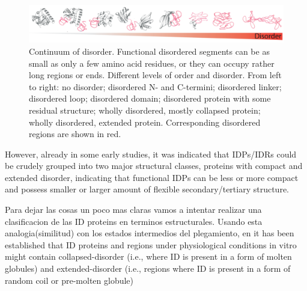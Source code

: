 \begin{figure}[htbp]
\centering
\includegraphics[width=1.0\textwidth]{img/conformationContinuum.png} 
\caption{Continuum of disorder. Functional disordered segments can be as small as only a few amino acid residues, or they can occupy rather long
regions or ends. Different levels of order and disorder. From left to right: no disorder; disordered N- and C-termini; disordered linker; disordered loop;
disordered domain; disordered protein with some residual structure; wholly disordered, mostly collapsed protein; wholly disordered, extended protein.
Corresponding disordered regions are shown in red.}
\label{conformationContinuum}
\end{figure}




However, already in some early studies, it was indicated that IDPs/IDRs could be crudely grouped into two major structural classes, proteins with compact and extended disorder, 
indicating that functional IDPs can be less or more compact and possess smaller or larger amount of flexible secondary/tertiary structure.

Para dejar las cosas un poco mas claras vamos a intentar realizar una clasificacion de las ID proteins en terminos estructurales.
Usando esta analogia(similitud) con los estados intermedios del plegamiento, en \cite{uversky2010understanding} it has been established that ID proteins and regions under physiological conditions in vitro might 
contain collapsed-disorder (i.e., where ID is present in a form of molten globules) and extended-disorder (i.e., regions where ID is present in a form of random coil or pre-molten globule)

